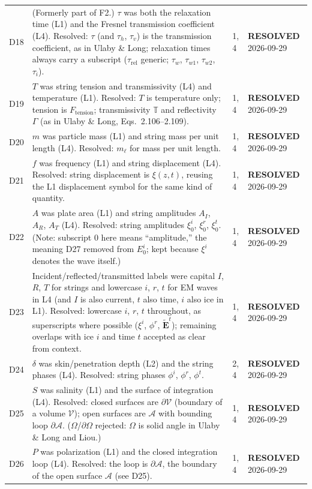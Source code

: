 \documentclass[11pt, oneside]{article}
\newcommand{\resolved}{\textbf{RESOLVED}}
\begin{document}
\begin{longtable}{l >{\raggedright\arraybackslash}p{} l l}
D18 & (Formerly part of F2.) $\tau$ was both the relaxation time (L1) and the Fresnel transmission coefficient (L4). Resolved: $\tau$ (and $\tau_h$, $\tau_v$) is the transmission coefficient, as in Ulaby \& Long; relaxation times always carry a subscript ($\tau_\mathrm{rel}$ generic; $\tau_w$, $\tau_{w1}$, $\tau_{w2}$, $\tau_i$). & 1, 4 & \resolved{} 2026-09-29 \\
D19 & $T$ was string tension and transmissivity (L4) and temperature (L1). Resolved: $T$ is temperature only; tension is $F_\mathrm{tension}$; transmissivity $\mathbb{T}$ and reflectivity $\Gamma$ (as in Ulaby \& Long, Eqs.~2.106--2.109). & 1, 4 & \resolved{} 2026-09-29 \\
D20 & $m$ was particle mass (L1) and string mass per unit length (L4). Resolved: $m_\ell$ for mass per unit length. & 1, 4 & \resolved{} 2026-09-29 \\
D21 & $f$ was frequency (L1) and string displacement (L4). Resolved: string displacement is $\xi(z,t)$, reusing the L1 displacement symbol for the same kind of quantity. & 1, 4 & \resolved{} 2026-09-29 \\
D22 & $A$ was plate area (L1) and string amplitudes $A_I$, $A_R$, $A_T$ (L4). Resolved: string amplitudes $\xi_0^i$, $\xi_0^r$, $\xi_0^t$. (Note: subscript 0 here means ``amplitude,'' the meaning D27 removed from $E_0^i$; kept because $\xi^i$ denotes the wave itself.) & 1, 4 & \resolved{} 2026-09-29 \\
D23 & Incident/reflected/transmitted labels were capital $I$, $R$, $T$ for strings and lowercase $i$, $r$, $t$ for EM waves in L4 (and $I$ is also current, $t$ also time, $i$ also ice in L1). Resolved: lowercase $i$, $r$, $t$ throughout, as superscripts where possible ($\xi^i$, $\phi^r$, $\tilde{\mathbf{E}}^t$); remaining overlaps with ice $i$ and time $t$ accepted as clear from context. & 1, 4 & \resolved{} 2026-09-29 \\
D24 & $\delta$ was skin/penetration depth (L2) and the string phases (L4). Resolved: string phases $\phi^i$, $\phi^r$, $\phi^t$. & 2, 4 & \resolved{} 2026-09-29 \\
D25 & $S$ was salinity (L1) and the surface of integration (L4). Resolved: closed surfaces are $\partial\mathcal{V}$ (boundary of a volume $\mathcal{V}$); open surfaces are $\mathcal{A}$ with bounding loop $\partial\mathcal{A}$. ($\Omega$/$\partial\Omega$ rejected: $\Omega$ is solid angle in Ulaby \& Long and Liou.) & 1, 4 & \resolved{} 2026-09-29 \\
D26 & $P$ was polarization (L1) and the closed integration loop (L4). Resolved: the loop is $\partial\mathcal{A}$, the boundary of the open surface $\mathcal{A}$ (see D25). & 1, 4 & \resolved{} 2026-09-29 \\

\end{longtable}
\end{document}
